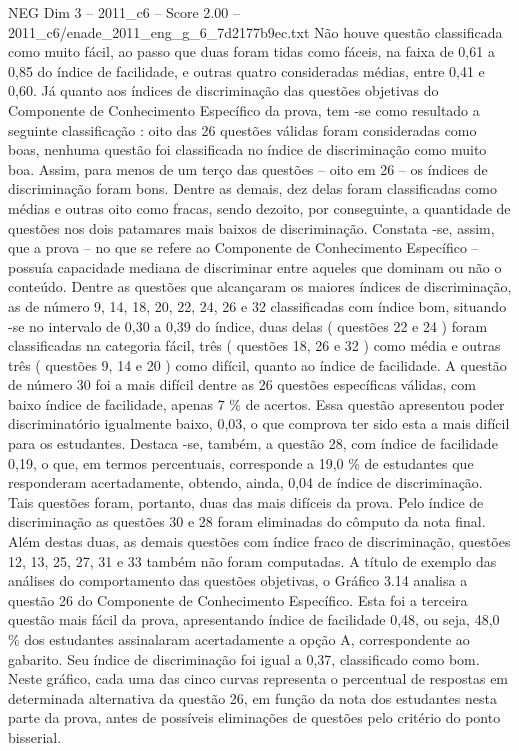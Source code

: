 \begin{textsample}{NEG Dim 3 – 2011\_c6 – Score 2.00 – 2011\_c6/enade\_2011\_eng\_g\_6\_7d2177b9ec.txt}
Não houve questão classificada como muito fácil, ao passo que duas foram tidas como fáceis, na faixa de 0,61 a 0,85 do índice de facilidade, e outras quatro consideradas médias, entre 0,41 e 0,60.
Já quanto aos índices de discriminação das questões objetivas do Componente de Conhecimento Específico da prova, tem -se como resultado a seguinte classificação : oito das 26 questões válidas foram consideradas como boas, nenhuma questão foi classificada no índice de discriminação como muito boa.
Assim, para menos de um terço das questões – oito em 26 – os índices de discriminação foram bons.
Dentre as demais, dez delas foram classificadas como médias e outras oito como fracas, sendo dezoito, por conseguinte, a quantidade de questões nos dois patamares mais baixos de discriminação.
Constata -se, assim, que a prova – no que se refere ao Componente de Conhecimento Específico – possuía capacidade mediana de discriminar entre aqueles que dominam ou não o conteúdo.
Dentre as questões que alcançaram os maiores índices de discriminação, as de número 9, 14, 18, 20, 22, 24, 26 e 32 classificadas com índice bom, situando -se no intervalo de 0,30 a 0,39 do índice, duas delas ( questões 22 e 24 ) foram classificadas na categoria fácil, três ( questões 18, 26 e 32 ) como média e outras três ( questões 9, 14 e 20 ) como difícil, quanto ao índice de facilidade.
A questão de número 30 foi a mais difícil dentre as 26 questões específicas válidas, com baixo índice de facilidade, apenas 7 \% de acertos.
Essa questão apresentou poder discriminatório igualmente baixo, 0,03, o que comprova ter sido esta a mais difícil para os estudantes.
Destaca -se, também, a questão 28, com índice de facilidade 0,19, o que, em termos percentuais, corresponde a 19,0 \% de estudantes que responderam acertadamente, obtendo, ainda, 0,04 de índice de discriminação.
Tais questões foram, portanto, duas das mais difíceis da prova.
Pelo índice de discriminação as questões 30 e 28 foram eliminadas do cômputo da nota final.
Além destas duas, as demais questões com índice fraco de discriminação, questões 12, 13, 25, 27, 31 e 33 também não foram computadas.
A título de exemplo das análises do comportamento das questões objetivas, o Gráfico 3.14 analisa a questão 26 do Componente de Conhecimento Específico.
Esta foi a terceira questão mais fácil da prova, apresentando índice de facilidade 0,48, ou seja, 48,0 \% dos estudantes assinalaram acertadamente a opção A, correspondente ao gabarito.
Seu índice de discriminação foi igual a 0,37, classificado como bom.
Neste gráfico, cada uma das cinco curvas representa o percentual de respostas em determinada alternativa da questão 26, em função da nota dos estudantes nesta parte da prova, antes de possíveis eliminações de questões pelo critério do ponto bisserial.

\end{textsample}
